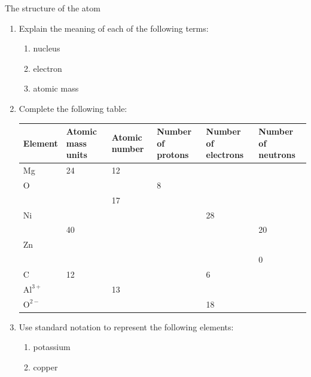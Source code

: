 \begin{exercises}{The structure of the atom} \noindent
      \label{m38745*id256225}\begin{enumerate}[noitemsep, label=\textbf{\arabic*}. ] 
            \label{m38745*uid15}\item Explain the meaning of each of the following terms:
\label{m38745*id256240}\begin{enumerate}[noitemsep, label=\textbf{\alph*}. ] 
            \label{m38745*uid16}\item nucleus
\label{m38745*uid17}\item electron
\label{m38745*uid18}\item atomic mass
\end{enumerate}
                \label{m38745*uid19}\item Complete the following table:
\begin{center} 
\begin{tabular}{|p{1.4cm}|p{1.4cm}|p{1.4cm}|p{2cm}|p{2cm}|p{2cm}|}\hline
\textbf{Element} & \textbf{Atomic mass units} & \textbf{Atomic number} & \textbf{Number of protons} & \textbf{Number of electrons} & \textbf{Number of neutrons}\\\hline
Mg & 24 & 12 & & & \\\hline
O & & & 8 & & \\\hline
 & & 17 & & & \\\hline
Ni & & & & 28 & \\\hline
 & 40 & & & & 20 \\\hline
Zn & & & & & \\\hline
 & & & & & 0 \\\hline
C & 12 & & & 6 & \\\hline 
$\text{Al}^{3+}$ &  & 13 & & &  \\ \hline
$\text{O}^{2-}$ & & & & 18 &  \\ \hline
\end{tabular}
\end{center}
    \par
          \label{m38745*uid20}\item Use standard notation to represent the following elements:
\label{m38745*id256772}\begin{enumerate}[noitemsep, label=\textbf{\alph*}. ] 
            \label{m38745*uid21}\item potassium
\label{m38745*uid22}\item copper

\end{enumerate}
\end{enumerate}
\end{exercises}
